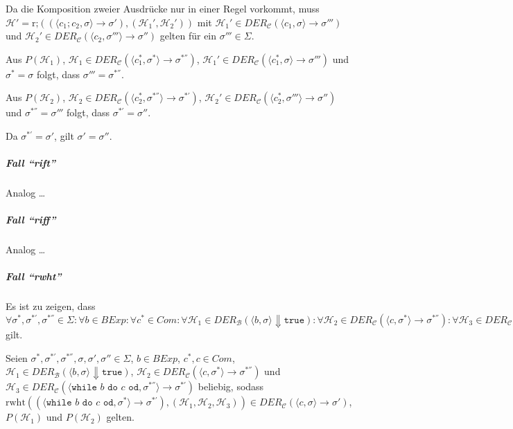 					Da die Komposition zweier Ausdrücke nur in einer Regel vorkommt, muss $ \mathcal{H}' = \text{r;}((\langle c _ 1 ; c _ 2, \sigma \rangle \rightarrow \sigma'), (\mathcal{H} _ 1 ', \mathcal{H} _ 2 ')) $ mit $ \mathcal{H} _ 1 ' \in \textit{DER} _ \mathcal{C} (\langle c _ 1, \sigma \rangle \rightarrow \sigma''') $ und $ \mathcal{H} _ 2 ' \in \textit{DER} _ \mathcal{C} (\langle c _ 2, \sigma''' \rangle \rightarrow \sigma'') $ gelten für ein $ \sigma''' \in \Sigma $.

					Aus $ P(\mathcal{H} _ 1) $, $ \mathcal{H} _ 1 \in \textit{DER} _ \mathcal{C} (\langle c _ 1 ^ *, \sigma ^ * \rangle \rightarrow \sigma ^ {*''}) $, $ \mathcal{H} _ 1 ' \in \textit{DER} _ \mathcal{C} (\langle c _ 1 ^ *, \sigma \rangle \rightarrow \sigma''') $ und $ \sigma ^ * = \sigma $ folgt, dass $ \sigma''' = \sigma ^ {*''} $.

					Aus $ P(\mathcal{H} _ 2) $, $ \mathcal{H} _ 2 \in \textit{DER} _ \mathcal{C} (\langle c _ 2 ^ *, \sigma ^ {*''} \rangle \rightarrow \sigma ^ {*'}) $, $ \mathcal{H} _ 2 ' \in \textit{DER} _ \mathcal{C} (\langle c _ 2 ^ *, \sigma''' \rangle \rightarrow \sigma'' ) $ und  $ \sigma ^ {*''} = \sigma''' $ folgt, dass $ \sigma ^ {*'} = \sigma'' $.

					Da $ \sigma ^ {*'} = \sigma' $, gilt $ \sigma' = \sigma'' $.

				\subparagraph{Fall \enquote{rift}}
					Analog \dots

				\subparagraph{Fall \enquote{riff}}
					Analog \dots

				\subparagraph{Fall \enquote{rwht}}
					Es ist zu zeigen, dass $ \forall \sigma ^ *, \sigma ^ {*'}, \sigma ^ {*''} \in \Sigma : \forall b \in \textit{BExp} : \forall c ^ * \in \textit{Com} : \forall \mathcal{H} _ 1 \in \textit{DER} _ \mathcal{B} (\langle b, \sigma \rangle \Downarrow \texttt{true}) : \forall \mathcal{H} _ 2 \in \textit{DER} _ \mathcal{C} (\langle c, \sigma ^ * \rangle \rightarrow \sigma ^ {*''}) : \forall \mathcal{H} _ 3 \in \textit{DER} _ \mathcal{C} (\langle \texttt{while } b \texttt{ do } c \texttt{ od}, \sigma ^ {*''} \rangle \rightarrow \sigma ^ {*'}) : P(\mathcal{H} _ 2) \land P(\mathcal{H} _ 3) \implies P(\text{rwht})((\langle \texttt{while } b \texttt{ do } c \texttt{ od}, \sigma ^ * \rangle \rightarrow \sigma ^ {*'}), (\mathcal{H} _ 1, \mathcal{H} _ 2, \mathcal{H} _ 3)) $ gilt.

					Seien $ \sigma ^ *, \sigma ^ {*'}, \sigma ^ {*''}, \sigma, \sigma', \sigma'' \in \Sigma $, $ b \in \textit{BExp} $, $ c ^ *, c \in \textit{Com} $, $ \mathcal{H} _ 1 \in \textit{DER} _ \mathcal{B} (\langle b, \sigma \rangle \Downarrow \texttt{true}) $, $ \mathcal{H} _ 2 \in \textit{DER} _ \mathcal{C} (\langle c, \sigma ^ * \rangle \rightarrow \sigma ^ {*''}) $ und $ \mathcal{H} _ 3 \in \textit{DER} _ \mathcal{C} (\langle \texttt{while } b \texttt{ do } c \texttt{ od}, \sigma ^ {*''} \rangle \rightarrow \sigma ^ {*'}) $ beliebig, sodass $ \text{rwht}((\langle \texttt{while } b \texttt{ do } c \texttt{ od}, \sigma ^ * \rangle \rightarrow \sigma ^ {*'}), (\mathcal{H} _ 1, \mathcal{H} _ 2, \mathcal{H} _ 3)) \in \textit{DER} _ \mathcal{C} (\langle c, \sigma \rangle \rightarrow \sigma') $, $ P(\mathcal{H} _ 1) $ und $ P(\mathcal{H} _ 2) $ gelten.

